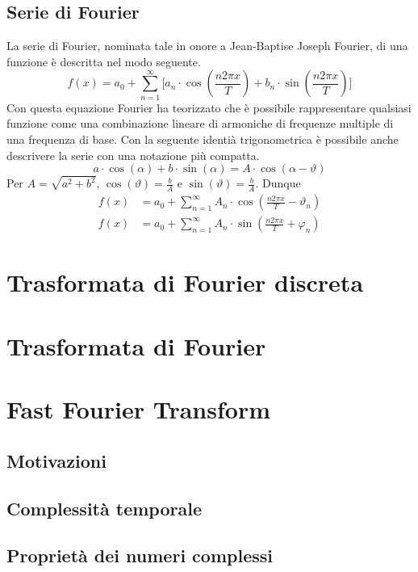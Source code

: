 \subsection{Serie di Fourier}
La serie di Fourier, nominata tale in onore a Jean-Baptise Joseph Fourier, di
una funzione \`e descritta nel modo seguente.
\begin{equation} \label{eq:fourier-series}
    f(x) = a_0 + \sum_{n=1}^{\infty}\Big [
        a_n\cdot\cos(\frac{n2\pi x}{T}) +
        b_n\cdot\sin(\frac{n2\pi x}{T}) \Big ]
\end{equation}
Con questa equazione Fourier ha teorizzato che \`e possibile rappresentare
qualsiasi funzione come una combinazione lineare di armoniche di frequenze
multiple di una frequenza di base. Con la seguente identi\`a trigonometrica
\`e possibile anche descrivere la serie con una notazione pi\`u compatta.
\begin{equation*}
    a\cdot\cos(\alpha) + b\cdot\sin(\alpha) = A\cdot\cos(\alpha-\vartheta)
\end{equation*}
Per \(A = \sqrt{a^2+b^2}\), \(\cos(\vartheta)=\frac{b}{A}\) e
\(\sin(\vartheta)=\frac{b}{A}\). Dunque
\begin{align}
    f(x) &= a_0 + \sum_{n=1}^{\infty} 
        A_n\cdot\cos(\frac{n2\pi x}{T} - \vartheta_n) \\
    f(x) &= a_0 + \sum_{n=1}^{\infty} 
        A_n\cdot\sin(\frac{n2\pi x}{T} + \varphi_n)
\end{align}

\section{Trasformata di Fourier discreta}

\section{Trasformata di Fourier}

\section{Fast Fourier Transform}
\subsection{Motivazioni}
\subsection{Complessit\`a temporale}
\subsection{Propriet\`a dei numeri complessi}

